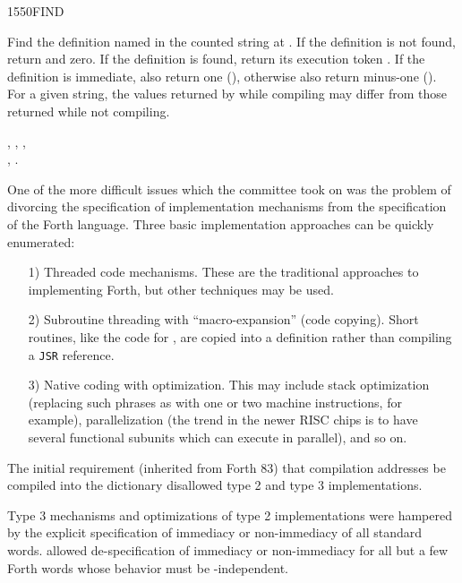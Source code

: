 \begin{worddef}{1550}{FIND}
\item {}

	Find the definition named in the counted string at .
	If the definition is not found, return  and zero.
	If the definition is found, return its execution token .
	If the definition is immediate, also return one (),
	otherwise also return minus-one (). For a given string,
	the values returned by  while compiling may differ
	from those returned while not compiling.

\see {},
	,
	, \\
	,
	.

	\begin{rationale} %
		One of the more difficult issues which the committee took on
		was the problem of divorcing the specification of
		implementation mechanisms from the specification of the
		Forth language. Three basic implementation approaches can be
		quickly enumerated:

		\begin{enumerate}
		\item[1)] Threaded code mechanisms.
			These are the traditional approaches to implementing Forth,
			but other techniques may be used.

		\item[2)] Subroutine threading with ``macro-expansion'' (code
			copying). Short routines, like the code for ,
			are copied into a definition rather than compiling a
			\texttt{JSR} reference.

		\item[3)] Native coding with optimization.
			This may include stack optimization (replacing such phrases
			as   \word{+} with one or two machine
			instructions, for example), parallelization (the trend in
			the newer RISC chips is to have several functional subunits
			which can execute in parallel), and so on.
		\end{enumerate}

		The initial requirement (inherited from Forth 83) that
		compilation addresses be compiled into the dictionary
		disallowed type 2 and type 3 implementations.

		Type 3 mechanisms and optimizations of type 2 implementations
		were hampered by the explicit specification of immediacy or
		non-immediacy of all standard words.  allowed
		de-spec\-i\-fi\-ca\-tion of immediacy or non-immediacy for all but a
		few Forth words whose behavior must be -independent.


\end{rationale}
\end{worddef}
